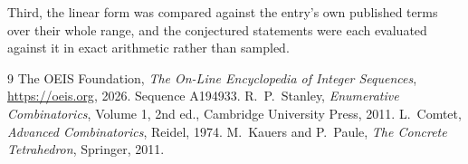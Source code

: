 \documentclass[11pt,a4paper]{article}
\theoremstyle{plain}
\theoremstyle{definition}
\begin{document}
Third, the linear form was compared against the entry's own published terms over their whole
range, and the conjectured statements were each evaluated against it in exact arithmetic
rather than sampled.

\begin{thebibliography}{9}
 The OEIS Foundation, \emph{The On-Line Encyclopedia of Integer
Sequences}, \url{https://oeis.org}, 2026. Sequence A194933.
 R.~P.~Stanley, \emph{Enumerative Combinatorics}, Volume 1, 2nd ed.,
Cambridge University Press, 2011.
 L.~Comtet, \emph{Advanced Combinatorics}, Reidel, 1974.
 M.~Kauers and P.~Paule, \emph{The Concrete Tetrahedron}, Springer, 2011.
\end{thebibliography}
\end{document}
